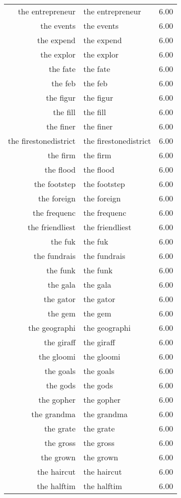 \begin{table}[ht]
\begin{tabular}{rlr}
  the entrepreneur & the entrepreneur & 6.00 \\ 
  the events & the events & 6.00 \\ 
  the expend & the expend & 6.00 \\ 
  the explor & the explor & 6.00 \\ 
  the fate & the fate & 6.00 \\ 
  the feb & the feb & 6.00 \\ 
  the figur & the figur & 6.00 \\ 
  the fill & the fill & 6.00 \\ 
  the finer & the finer & 6.00 \\ 
  the firestonedistrict & the firestonedistrict & 6.00 \\ 
  the firm & the firm & 6.00 \\ 
  the flood & the flood & 6.00 \\ 
  the footstep & the footstep & 6.00 \\ 
  the foreign & the foreign & 6.00 \\ 
  the frequenc & the frequenc & 6.00 \\ 
  the friendliest & the friendliest & 6.00 \\ 
  the fuk & the fuk & 6.00 \\ 
  the fundrais & the fundrais & 6.00 \\ 
  the funk & the funk & 6.00 \\ 
  the gala & the gala & 6.00 \\ 
  the gator & the gator & 6.00 \\ 
  the gem & the gem & 6.00 \\ 
  the geographi & the geographi & 6.00 \\ 
  the giraff & the giraff & 6.00 \\ 
  the gloomi & the gloomi & 6.00 \\ 
  the goals & the goals & 6.00 \\ 
  the gods & the gods & 6.00 \\ 
  the gopher & the gopher & 6.00 \\ 
  the grandma & the grandma & 6.00 \\ 
  the grate & the grate & 6.00 \\ 
  the gross & the gross & 6.00 \\ 
  the grown & the grown & 6.00 \\ 
  the haircut & the haircut & 6.00 \\ 
  the halftim & the halftim & 6.00 \\ 

\end{tabular}
\end{table}
